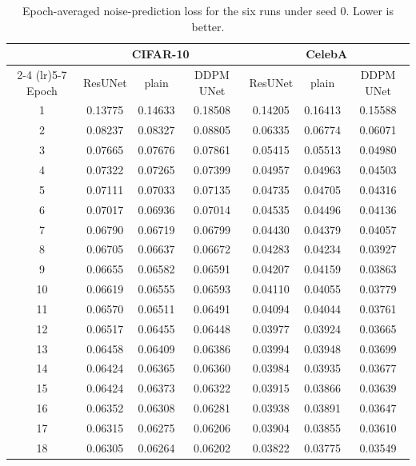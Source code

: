 \begin{table}[htbp]
    \centering
    \caption{Epoch-averaged noise-prediction loss for the six runs under seed 0. Lower is better.}
    \label{tab:loss-full}
    \footnotesize
    \begin{tabular}{ccccccc}
        \toprule
        & \multicolumn{3}{c}{CIFAR-10} & \multicolumn{3}{c}{CelebA} \\
        \cmidrule(lr){2-4} \cmidrule(lr){5-7}
        Epoch & ResUNet & plain & DDPM UNet & ResUNet & plain & DDPM UNet \\
        \midrule
        1 & 0.13775 & 0.14633 & 0.18508 & 0.14205 & 0.16413 & 0.15588 \\
        2 & 0.08237 & 0.08327 & 0.08805 & 0.06335 & 0.06774 & 0.06071 \\
        3 & 0.07665 & 0.07676 & 0.07861 & 0.05415 & 0.05513 & 0.04980 \\
        4 & 0.07322 & 0.07265 & 0.07399 & 0.04957 & 0.04963 & 0.04503 \\
        5 & 0.07111 & 0.07033 & 0.07135 & 0.04735 & 0.04705 & 0.04316 \\
        6 & 0.07017 & 0.06936 & 0.07014 & 0.04535 & 0.04496 & 0.04136 \\
        7 & 0.06790 & 0.06719 & 0.06799 & 0.04430 & 0.04379 & 0.04057 \\
        8 & 0.06705 & 0.06637 & 0.06672 & 0.04283 & 0.04234 & 0.03927 \\
        9 & 0.06655 & 0.06582 & 0.06591 & 0.04207 & 0.04159 & 0.03863 \\
        10 & 0.06619 & 0.06555 & 0.06593 & 0.04110 & 0.04055 & 0.03779 \\
        11 & 0.06570 & 0.06511 & 0.06491 & 0.04094 & 0.04044 & 0.03761 \\
        12 & 0.06517 & 0.06455 & 0.06448 & 0.03977 & 0.03924 & 0.03665 \\
        13 & 0.06458 & 0.06409 & 0.06386 & 0.03994 & 0.03948 & 0.03699 \\
        14 & 0.06424 & 0.06365 & 0.06360 & 0.03984 & 0.03935 & 0.03677 \\
        15 & 0.06424 & 0.06373 & 0.06322 & 0.03915 & 0.03866 & 0.03639 \\
        16 & 0.06352 & 0.06308 & 0.06281 & 0.03938 & 0.03891 & 0.03647 \\
        17 & 0.06315 & 0.06275 & 0.06206 & 0.03904 & 0.03855 & 0.03610 \\
        18 & 0.06305 & 0.06264 & 0.06202 & 0.03822 & 0.03775 & 0.03549 \\

\end{tabular}
\end{table}
